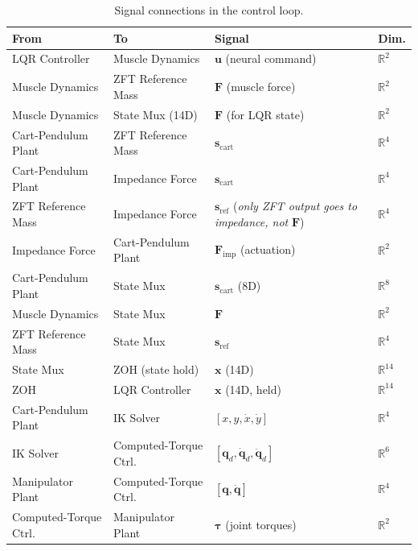 \documentclass[11pt, a4paper]{article}
\begin{document}
\begin{table}[H]
\centering
\caption{Signal connections in the control loop.}
\label{tab:signals}
\renewcommand{\arraystretch}{1.3}
\begin{tabular}{llll}
\toprule
\textbf{From} & \textbf{To} & \textbf{Signal} & \textbf{Dim.} \\
\midrule
LQR Controller       & Muscle Dynamics          & $\bm{u}$ (neural command)             & $\mathbb{R}^2$ \\
Muscle Dynamics      & ZFT Reference Mass       & $\bm{F}$ (muscle force)               & $\mathbb{R}^2$ \\
Muscle Dynamics      & State Mux (14D)          & $\bm{F}$ (for LQR state)             & $\mathbb{R}^2$ \\
Cart-Pendulum Plant  & ZFT Reference Mass       & $\bm{s}_{\mathrm{cart}}$              & $\mathbb{R}^4$ \\
Cart-Pendulum Plant  & Impedance Force          & $\bm{s}_{\mathrm{cart}}$              & $\mathbb{R}^4$ \\
ZFT Reference Mass   & Impedance Force          & $\bm{s}_{\mathrm{ref}}$ (\emph{only ZFT output goes to impedance, not} $\bm{F}$) & $\mathbb{R}^4$ \\
Impedance Force      & Cart-Pendulum Plant      & $\bm{F}_{\mathrm{imp}}$ (actuation) & $\mathbb{R}^2$ \\
Cart-Pendulum Plant  & State Mux                & $\bm{s}_{\mathrm{cart}}$ (8D)     & $\mathbb{R}^8$ \\
Muscle Dynamics      & State Mux                & $\bm{F}$                          & $\mathbb{R}^2$ \\
ZFT Reference Mass   & State Mux                & $\bm{s}_{\mathrm{ref}}$           & $\mathbb{R}^4$ \\
State Mux            & ZOH (state hold)         & $\bm{x}$ (14D)                    & $\mathbb{R}^{14}$ \\
ZOH                  & LQR Controller           & $\bm{x}$ (14D, held)              & $\mathbb{R}^{14}$ \\
\midrule
Cart-Pendulum Plant  & IK Solver                & $[x, y, \dot{x}, \dot{y}]$       & $\mathbb{R}^4$ \\
IK Solver            & Computed-Torque Ctrl.    & $[\bm{q}_d, \dot{\bm{q}}_d, \ddot{\bm{q}}_d]$ & $\mathbb{R}^6$ \\
Manipulator Plant    & Computed-Torque Ctrl.    & $[\bm{q}, \dot{\bm{q}}]$         & $\mathbb{R}^4$ \\
Computed-Torque Ctrl.& Manipulator Plant        & $\bm{\tau}$ (joint torques)       & $\mathbb{R}^2$ \\
\bottomrule
\end{tabular}
\end{table}
\end{document}
